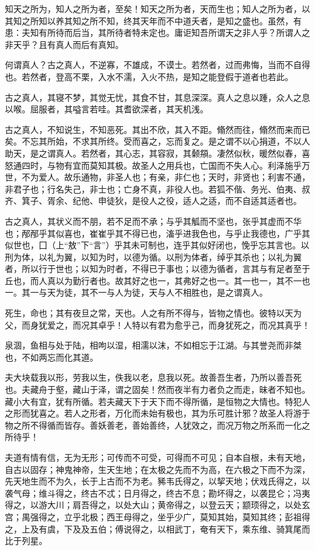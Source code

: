 \documentclass[]{article}
\begin{document}
知天之所为，知人之所为者，至矣！知天之所为者，天而生也；知人之所为者，以其知之所知以养其知之所不知，终其天年而不中道夭者，是知之盛也。虽然，有患：夫知有所待而后当，其所待者特未定也。庸讵知吾所谓天之非人乎？所谓人之非天乎？且有真人而后有真知。

何谓真人？古之真人，不逆寡，不雄成，不谟士。若然者，过而弗悔，当而不自得也。若然者，登高不栗，入水不濡，入火不热，是知之能登假于道者也若此。

古之真人，其寝不梦，其觉无忧，其食不甘，其息深深。真人之息以踵，众人之息以喉。屈服者，其嗌言若哇。其耆欲深者，其天机浅。

古之真人，不知说生，不知恶死。其出不欣，其入不距。翛然而往，翛然而来而已矣。不忘其所始，不求其所终。受而喜之，忘而复之。是之谓不以心捐道，不以人助天，是之谓真人。若然者，其心志，其容寂，其颡頯。凄然似秋，暖然似春，喜怒通四时，与物有宜而莫知其极。故圣人之用兵也，亡国而不失人心。利泽施乎万世，不为爱人。故乐通物，非圣人也；有亲，非仁也；天时，非贤也；利害不通，非君子也；行名失己，非士也；亡身不真，非役人也。若狐不偕、务光、伯夷、叔齐、箕子、胥余、纪他、申徒狄，是役人之役，适人之适，而不自适其适者也。

古之真人，其状义而不朋，若不足而不承；与乎其觚而不坚也，张乎其虚而不华也；邴邴乎其似喜也，崔崔乎其不得已也，滀乎进我色也，与乎止我德也，广乎其似世也，囗（上``敖''下``言''）乎其未可制也，连乎其似好闭也，悗乎忘其言也。以刑为体，以礼为翼，以知为时，以德为循。以刑为体者，绰乎其杀也；以礼为翼者，所以行于世也；以知为时者，不得已于事也；以德为循者，言其与有足者至于丘也，而人真以为勤行者也。故其好之也一，其弗好之也一。其一也一，其不一也一。其一与天为徒，其不一与人为徒，天与人不相胜也，是之谓真人。

死生，命也；其有夜旦之常，天也。人之有所不得与，皆物之情也。彼特以天为父，而身犹爱之，而况其卓乎！人特以有君为愈乎己，而身犹死之，而况其真乎！

泉涸，鱼相与处于陆，相呴以湿，相濡以沫，不如相忘于江湖。与其誉尧而非桀也，不如两忘而化其道。

夫大块载我以形，劳我以生，佚我以老，息我以死。故善吾生者，乃所以善吾死也。夫藏舟于壑，藏山于泽，谓之固矣！然而夜半有力者负之而走，昧者不知也。藏小大有宜，犹有所循。若夫藏天下于天下而不得所循，是恒物之大情也。特犯人之形而犹喜之。若人之形者，万化而未始有极也，其为乐可胜计邪？故圣人将游于物之所不得循而皆存。善妖善老，善始善终，人犹效之，而况万物之所系而一化之所待乎！

夫道有情有信，无为无形；可传而不可受，可得而不可见；自本自根，未有天地，自古以固存；神鬼神帝，生天生地；在太极之先而不为高，在六极之下而不为深，先天地生而不为久，长于上古而不为老。豨韦氏得之，以挈天地；伏戏氏得之，以袭气母；维斗得之，终古不忒；日月得之，终古不息；勘坏得之，以袭昆仑；冯夷得之，以游大川；肩吾得之，以处大山；黄帝得之，以登云天；颛顼得之，以处玄宫；禺强得之，立乎北极；西王母得之，坐乎少广，莫知其始，莫知其终；彭祖得之，上及有虞，下及及五伯；傅说得之，以相武丁，奄有天下，乘东维、骑箕尾而比于列星。
\end{document}
